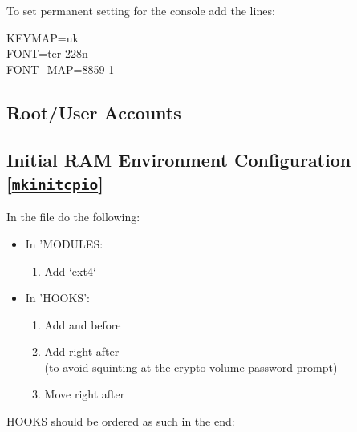 \begin{blocksection}
    To set permanent setting for the console add the lines:\\
    \begin{codeblock}
    KEYMAP=uk\\
    FONT=ter-228n\\
    FONT\_MAP=8859-1
    \end{codeblock}
\end{blocksection}

\subsection{Root/User Accounts}


\subsection{Initial RAM Environment Configuration [\href{https://wiki.archlinux.org/index.php/mkinitcpio}{\texttt{mkinitcpio}}]}

\begin{blocksection}
    In the file do the following:
    \begin{itemize}[noitemsep,topsep=0pt,leftmargin=*]
        \item In 'MODULES:
        \begin{enumerate}
            \item Add `ext4`
        \end{enumerate}
        \item In 'HOOKS':
        \begin{enumerate}
            \item Add  and  before 
            \item Add  right after \\
                  (to avoid squinting at the crypto volume password prompt)
            \item Move  right after 
        \end{enumerate}
    \end{itemize}
    HOOKS should be ordered as such in the end:\\
\end{blocksection}
        
